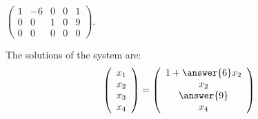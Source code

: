 \documentclass{ximera}
\begin{document}
\begin{exercise} \label{c2.3.7c}
$\left(\begin{array}{rrrr|r}
 1  & -6 & 0 & 0 & 1\\
 0  &  0 & 1 & 0 & 9 \\
 0  &  0 & 0 & 0 & 0
       \end{array}\right)$.
     \begin{selectAll}
     \end{selectAll}
     \begin{exercise}
       The solutions of the system are:
\[
\left(\begin{array}{r} x_1 \\ x_2 \\ x_3\\ x_4\end{array} \right)
= \left(\begin{array}{c} 1 + \answer{6}x_2 \\ x_2 \\ \answer{9} \\ x_4\end{array} \right)
\]
     \end{exercise}
\end{exercise}
\end{document}
